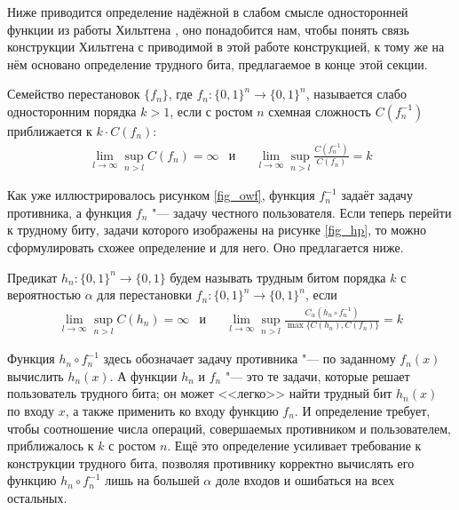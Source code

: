 \documentclass[a4paper, 14pt]{extarticle}
\begin{document}
Ниже приводится определение надёжной в слабом смысле односторонней функции из
работы Хильтгена \cite{hiltgen1993}, оно понадобится нам, чтобы понять связь
конструкции Хильтгена с приводимой в этой работе конструкцией, к тому же на нём
основано определение трудного бита, предлагаемое в конце этой секции.

\begin{definition}
Семейство перестановок $\{f_n\}$, где $f_n : \{0, 1\}^n \to \{0, 1\}^n$,
называется слабо односторонним порядка $k > 1$, если с ростом $n$ схемная
сложность $C(f_n^{-1})$ приближается к $k \cdot C(f_n)$:
\[
\begin{aligned}
&\lim_{l \to \infty} \sup_{n > l} C(f_n) = \infty
&
\text{и}&
&
\lim_{l \to \infty} \sup_{n > l} \frac {C(f_n^{-1})} {C(f_n)} = k&
\end{aligned}
\]
\end{definition}

Как уже иллюстрировалось рисунком \ref{fig_owf}, функция $f_n^{-1}$ задаёт
задачу противника, а функция $f_n$ "--- задачу честного пользователя. Если
теперь перейти к трудному биту, задачи которого изображены на рисунке
\ref{fig_hp}, то можно сформулировать схожее определение и для него. Оно
предлагается ниже.

\begin{definition}
Предикат $h_n : \{0, 1\}^n \to \{0, 1\}$ будем называть трудным битом порядка
$k$ с вероятностью $\alpha$ для перестановки $f_n : \{0, 1\}^n \to \{0, 1\}^n$,
если
\[
\begin{aligned}
&\lim_{l \to \infty} \sup_{n > l} C(h_n) = \infty
&
\text{и}&
&
\lim_{l \to \infty} \sup_{n > l} \frac {C_\alpha(h_n \circ f_n^{-1})} {\max \{ C(h_n), C(f_n) \}} = k&
\end{aligned}
\]
\end{definition}

Функция $h_n \circ f_n^{-1}$ здесь обозначает задачу противника "--- по
заданному $f_n(x)$ вычислить $h_n(x)$. А функции $h_n$ и $f_n$ "--- это те
задачи, которые решает пользователь трудного бита; он может <<легко>> найти
трудный бит $h_n(x)$ по входу $x$, а также применить ко входу функцию $f_n$. И
определение требует, чтобы соотношение числа операций, совершаемых противником и
пользователем, приближалось к $k$ с ростом $n$. Ещё это определение усиливает
требование к конструкции трудного бита, позволяя противнику корректно вычислять
его функцию $h_n \circ f_n^{-1}$ лишь на большей $\alpha$ доле входов и
ошибаться на всех остальных.
\end{document}
